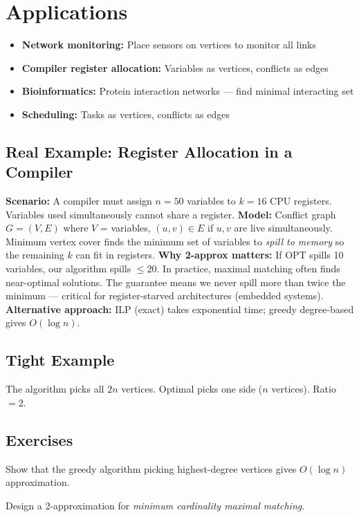 \section{Applications}
\begin{itemize}
    \item \textbf{Network monitoring:} Place sensors on vertices to monitor all links
    \item \textbf{Compiler register allocation:} Variables as vertices, conflicts as edges
    \item \textbf{Bioinformatics:} Protein interaction networks — find minimal interacting set
    \item \textbf{Scheduling:} Tasks as vertices, conflicts as edges
\end{itemize}

\subsection*{Real Example: Register Allocation in a Compiler}
\textbf{Scenario:} A compiler must assign $n=50$ variables to $k=16$ CPU registers. Variables used simultaneously cannot share a register.
\textbf{Model:} Conflict graph $G=(V,E)$ where $V$ = variables, $(u,v) \in E$ if $u,v$ are live simultaneously. Minimum vertex cover finds the minimum set of variables to \emph{spill to memory} so the remaining $k$ can fit in registers.
\textbf{Why 2-approx matters:} If OPT spills 10 variables, our algorithm spills $\leq 20$. In practice, maximal matching often finds near-optimal solutions. The guarantee means we never spill more than twice the minimum — critical for register-starved architectures (embedded systems).
\textbf{Alternative approach:} ILP (exact) takes exponential time; greedy degree-based gives $O(\log n)$.

\subsection{Tight Example}

\begin{example}
The algorithm picks all $2n$ vertices. Optimal picks one side ($n$ vertices). Ratio $= 2$.
\end{example}

\subsection{Exercises}
\begin{exercise}
Show that the greedy algorithm picking highest-degree vertices gives $O(\log n)$ approximation.
\end{exercise}
\begin{exercise}
Design a 2-approximation for \emph{minimum cardinality maximal matching}.
\end{exercise}

